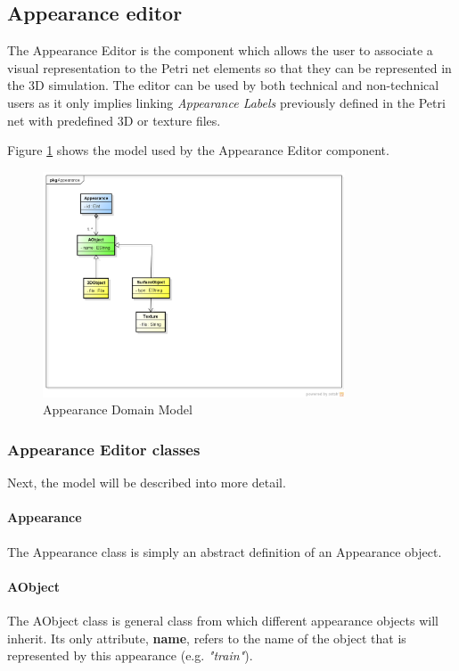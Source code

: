 \subsection{Appearance editor}

The Appearance Editor is the component which allows the user to associate a visual representation to the Petri net elements so that they can be represented in the 3D simulation. The editor can be used by both technical and non-technical users as it only implies linking \textit{Appearance Labels} previously defined in the Petri net with predefined 3D or texture files. 

Figure \ref{fig:appearance} shows the model used by the Appearance Editor component.

\begin{figure}[htp]
\begin{center}
  \includegraphics[width=0.8\textwidth]{image/appearance-model.png}
  \caption{Appearance Domain Model}
  \label{fig:appearance}
\end{center}
\end{figure}  

\subsubsection{Appearance Editor classes}
Next, the model will be described into more detail.

\paragraph{Appearance}
The Appearance class is simply an abstract definition of an Appearance object.

\paragraph{AObject}
The AObject class is general class from which different appearance objects will inherit. Its only attribute, \textbf{name}, refers to the name of the object that is represented by this appearance (e.g. \textit{"train"}).

